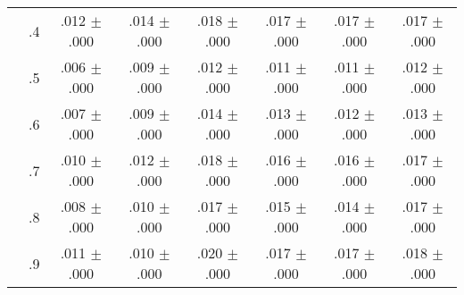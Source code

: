 \begin{tabular}{cccccccc}
 & .4 & .012 $\pm$ .000 & .014 $\pm$ .000 & .018 $\pm$ .000 & .017 $\pm$ .000 & .017 $\pm$ .000 & .017 $\pm$ .000 \\
 & .5 & .006 $\pm$ .000 & .009 $\pm$ .000 & .012 $\pm$ .000 & .011 $\pm$ .000 & .011 $\pm$ .000 & .012 $\pm$ .000 \\
 & .6 & .007 $\pm$ .000 & .009 $\pm$ .000 & .014 $\pm$ .000 & .013 $\pm$ .000 & .012 $\pm$ .000 & .013 $\pm$ .000 \\
 & .7 & .010 $\pm$ .000 & .012 $\pm$ .000 & .018 $\pm$ .000 & .016 $\pm$ .000 & .016 $\pm$ .000 & .017 $\pm$ .000 \\
 & .8 & .008 $\pm$ .000 & .010 $\pm$ .000 & .017 $\pm$ .000 & .015 $\pm$ .000 & .014 $\pm$ .000 & .017 $\pm$ .000 \\
 & .9 & .011 $\pm$ .000 & .010 $\pm$ .000 & .020 $\pm$ .000 & .017 $\pm$ .000 & .017 $\pm$ .000 & .018 $\pm$ .000 \\
\bottomrule
\end{tabular}